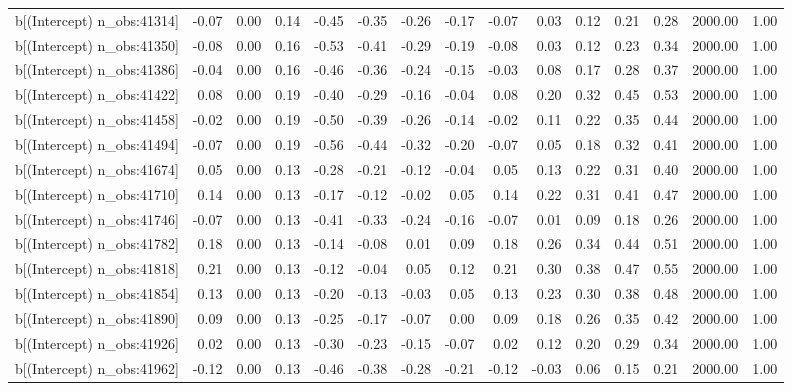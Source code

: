 \begin{table}[ht]
\begin{tabular}{rrrrrrrrrrrrrrr}
  b[(Intercept) n\_obs:41314] & -0.07 & 0.00 & 0.14 & -0.45 & -0.35 & -0.26 & -0.17 & -0.07 & 0.03 & 0.12 & 0.21 & 0.28 & 2000.00 & 1.00 \\ 
  b[(Intercept) n\_obs:41350] & -0.08 & 0.00 & 0.16 & -0.53 & -0.41 & -0.29 & -0.19 & -0.08 & 0.03 & 0.12 & 0.23 & 0.34 & 2000.00 & 1.00 \\ 
  b[(Intercept) n\_obs:41386] & -0.04 & 0.00 & 0.16 & -0.46 & -0.36 & -0.24 & -0.15 & -0.03 & 0.08 & 0.17 & 0.28 & 0.37 & 2000.00 & 1.00 \\ 
  b[(Intercept) n\_obs:41422] & 0.08 & 0.00 & 0.19 & -0.40 & -0.29 & -0.16 & -0.04 & 0.08 & 0.20 & 0.32 & 0.45 & 0.53 & 2000.00 & 1.00 \\ 
  b[(Intercept) n\_obs:41458] & -0.02 & 0.00 & 0.19 & -0.50 & -0.39 & -0.26 & -0.14 & -0.02 & 0.11 & 0.22 & 0.35 & 0.44 & 2000.00 & 1.00 \\ 
  b[(Intercept) n\_obs:41494] & -0.07 & 0.00 & 0.19 & -0.56 & -0.44 & -0.32 & -0.20 & -0.07 & 0.05 & 0.18 & 0.32 & 0.41 & 2000.00 & 1.00 \\ 
  b[(Intercept) n\_obs:41674] & 0.05 & 0.00 & 0.13 & -0.28 & -0.21 & -0.12 & -0.04 & 0.05 & 0.13 & 0.22 & 0.31 & 0.40 & 2000.00 & 1.00 \\ 
  b[(Intercept) n\_obs:41710] & 0.14 & 0.00 & 0.13 & -0.17 & -0.12 & -0.02 & 0.05 & 0.14 & 0.22 & 0.31 & 0.41 & 0.47 & 2000.00 & 1.00 \\ 
  b[(Intercept) n\_obs:41746] & -0.07 & 0.00 & 0.13 & -0.41 & -0.33 & -0.24 & -0.16 & -0.07 & 0.01 & 0.09 & 0.18 & 0.26 & 2000.00 & 1.00 \\ 
  b[(Intercept) n\_obs:41782] & 0.18 & 0.00 & 0.13 & -0.14 & -0.08 & 0.01 & 0.09 & 0.18 & 0.26 & 0.34 & 0.44 & 0.51 & 2000.00 & 1.00 \\ 
  b[(Intercept) n\_obs:41818] & 0.21 & 0.00 & 0.13 & -0.12 & -0.04 & 0.05 & 0.12 & 0.21 & 0.30 & 0.38 & 0.47 & 0.55 & 2000.00 & 1.00 \\ 
  b[(Intercept) n\_obs:41854] & 0.13 & 0.00 & 0.13 & -0.20 & -0.13 & -0.03 & 0.05 & 0.13 & 0.23 & 0.30 & 0.38 & 0.48 & 2000.00 & 1.00 \\ 
  b[(Intercept) n\_obs:41890] & 0.09 & 0.00 & 0.13 & -0.25 & -0.17 & -0.07 & 0.00 & 0.09 & 0.18 & 0.26 & 0.35 & 0.42 & 2000.00 & 1.00 \\ 
  b[(Intercept) n\_obs:41926] & 0.02 & 0.00 & 0.13 & -0.30 & -0.23 & -0.15 & -0.07 & 0.02 & 0.12 & 0.20 & 0.29 & 0.34 & 2000.00 & 1.00 \\ 
  b[(Intercept) n\_obs:41962] & -0.12 & 0.00 & 0.13 & -0.46 & -0.38 & -0.28 & -0.21 & -0.12 & -0.03 & 0.06 & 0.15 & 0.21 & 2000.00 & 1.00 \\ 

\end{tabular}
\end{table}
